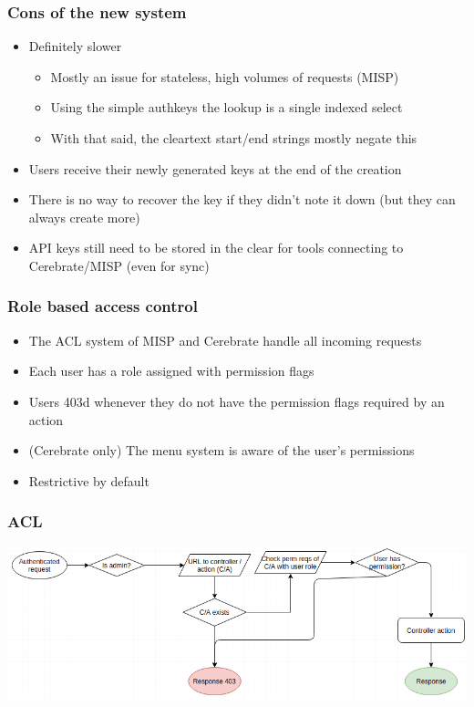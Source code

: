 \begin{frame}
  \frametitle{Cons of the new system}
  \begin{itemize}
    \item Definitely slower
    \begin{itemize}
        \item Mostly an issue for stateless, high volumes of requests (MISP)
        \item Using the simple authkeys the lookup is a single indexed select
        \item With that said, the cleartext start/end strings mostly negate this
    \end{itemize}
    \item Users receive their newly generated keys at the end of the creation
    \item There is no way to recover the key if they didn't note it down (but they can always create more)
    \item API keys still need to be stored in the clear for tools connecting to Cerebrate/MISP (even for sync)
  \end{itemize}
\end{frame}


\begin{frame}
  \frametitle{Role based access control}
  \begin{itemize}
    \item The ACL system of MISP and Cerebrate handle all incoming requests
    \item Each user has a role assigned with permission flags
    \item Users 403d whenever they do not have the permission flags required by an action
    \item (Cerebrate only) The menu system is aware of the user's permissions
    \item Restrictive by default
  \end{itemize}
\end{frame}

\begin{frame}
  \frametitle{ACL}
  \begin{center}
    \includegraphics[scale=0.5]{ACL.png}
  \end{center}
\end{frame}

